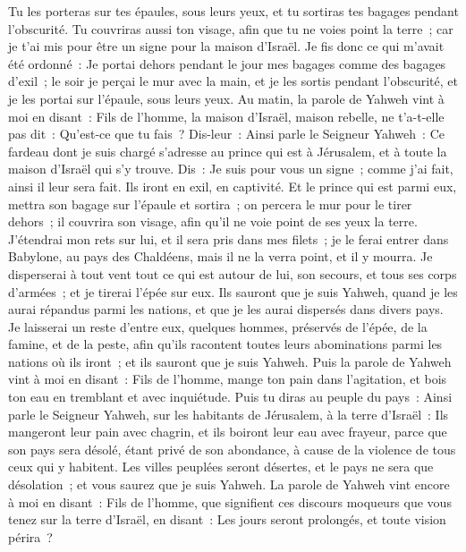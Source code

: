 \begin{multicols}{2}
Tu les porteras sur tes épaules, sous leurs yeux, et tu sortiras tes bagages pendant l'obscurité. Tu couvriras aussi ton visage, afin que tu ne voies point la terre~; car je t'ai mis pour être un signe pour la maison d'Israël.
Je fis donc ce qui m'avait été ordonné~: Je portai dehors pendant le jour mes bagages comme des bagages d'exil~; le soir je perçai le mur avec la main, et je les sortis pendant l'obscurité, et je les portai sur l'épaule, sous leurs yeux.
Au matin, la parole de Yahweh vint à moi en disant~:
Fils de l'homme, la maison d'Israël, maison rebelle, ne t'a-t-elle pas dit~: Qu'est-ce que tu fais~?
Dis-leur~: Ainsi parle le Seigneur Yahweh~: Ce fardeau dont je suis chargé s'adresse au prince qui est à Jérusalem, et à toute la maison d'Israël qui s'y trouve.
Dis~: Je suis pour vous un signe~; comme j'ai fait, ainsi il leur sera fait. Ils iront en exil, en captivité.
Et le prince qui est parmi eux, mettra son bagage sur l'épaule et sortira~; on percera le mur pour le tirer dehors~; il couvrira son visage, afin qu'il ne voie point de ses yeux la terre.
J'étendrai mon rets sur lui, et il sera pris dans mes filets~; je le ferai entrer dans Babylone, au pays des Chaldéens, mais il ne la verra point, et il y mourra.
Je disperserai à tout vent tout ce qui est autour de lui, son secours, et tous ses corps d'armées~; et je tirerai l'épée sur eux.
Ils sauront que je suis Yahweh, quand je les aurai répandus parmi les nations, et que je les aurai dispersés dans divers pays.
Je laisserai un reste d'entre eux, quelques hommes, préservés de l'épée, de la famine, et de la peste, afin qu'ils racontent toutes leurs abominations parmi les nations où ils iront~; et ils sauront que je suis Yahweh.
Puis la parole de Yahweh vint à moi en disant~:
Fils de l'homme, mange ton pain dans l'agitation, et bois ton eau en tremblant et avec inquiétude.
Puis tu diras au peuple du pays~: Ainsi parle le Seigneur Yahweh, sur les habitants de Jérusalem, à la terre d'Israël~: Ils mangeront leur pain avec chagrin, et ils boiront leur eau avec frayeur, parce que son pays sera désolé, étant privé de son abondance, à cause de la violence de tous ceux qui y habitent.
Les villes peuplées seront désertes, et le pays ne sera que désolation~; et vous saurez que je suis Yahweh.
La parole de Yahweh vint encore à moi en disant~:
Fils de l'homme, que signifient ces discours moqueurs que vous tenez sur la terre d'Israël, en disant~: Les jours seront prolongés, et toute vision périra~?

\end{multicols}
